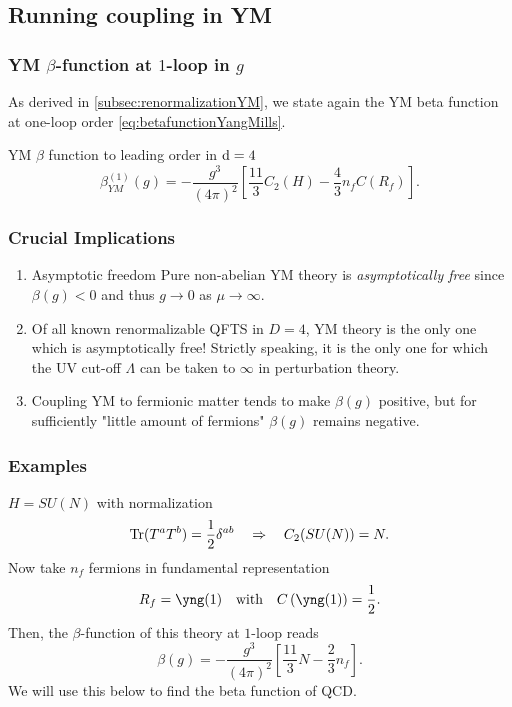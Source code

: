 \subsection{Running coupling in YM}
\subsubsection{YM  $\beta$-function at $1$-loop in $g$}
As derived in \ref{subsec:renormalizationYM}, we state again the YM beta function at one-loop order \ref{eq:betafunctionYangMills}.
\begin{mybox}{YM $\beta$ function to leading order in $\mathrm{d}=4$}
	\begin{equation}
	\beta^{(1)}_{YM}(g) = - \frac{g^3}{(4 \pi)^2} \left[\frac{11}{3} C_2(H) - \frac{4}{3} n_f C(R_f)\right].
	\end{equation}
\end{mybox}
\subsubsection{Crucial Implications}
\begin{enumerate}
	\item \begin{mybox}{Asymptotic freedom}
	Pure non-abelian YM theory is \emph{asymptotically free} since $\beta(g)<0$ and thus $g\rightarrow 0$ as $\mu \rightarrow\infty$.
	\end{mybox}
\item \begin{mybox}{}	
	Of all known renormalizable QFTS in $D=4$, YM theory is the only one which is asymptotically free!
	Strictly speaking, it is the only one for which the UV cut-off $\Lambda$ can be taken to $\infty$ in perturbation theory.
\end{mybox}
	\item Coupling YM to fermionic matter tends to make $\beta(g)$ positive, but for sufficiently "little amount of fermions" $\beta(g)$ remains negative.
\end{enumerate}
\subsubsection{Examples}
$H=SU(N)$ with normalization 
\begin{equation}
	\mathrm{Tr}(T^a T^b) = \frac{1}{2} \delta^{ab} \quad \Rightarrow \quad  C_2(SU(N)) = N.
\end{equation}
Now take $n_f$ fermions in fundamental representation
\begin{equation*}
	R_f = \yng(1) \quad \text{with} \quad C\left(\yng(1)\right)=\half.
\end{equation*}
Then, the $\beta$-function of this theory at $1$-loop reads
\begin{equation}
	\beta(g) = -\frac{g^3}{(4\pi)^2} \left[\frac{11}{3} N-\frac{2}{3}n_f\right].
\end{equation}
We will use this below to find the beta function of QCD.
